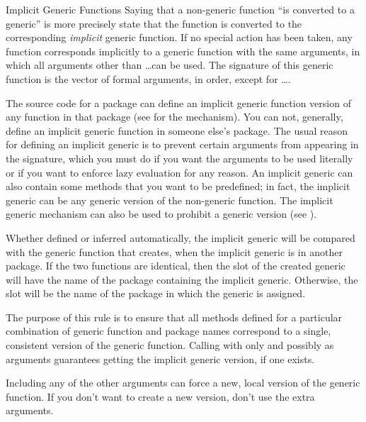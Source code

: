 %
\begin{Section}{Implicit Generic Functions}
Saying that a non-generic function ``is converted to a generic''
is more precisely state that the function is converted to the
corresponding \emph{implicit} generic function.  If no special action
has been taken, any function corresponds implicitly to a generic
function with the same arguments, in which all arguments other than
\dots can be used.  The signature of this generic function is the
vector of formal arguments, in order, except for \dots.

The source code for a package can define an implicit generic function
version of any function in that package (see 
for the mechanism).  You can not, generally, define an implicit
generic function in someone else's package. The usual reason for
defining an implicit generic is to prevent certain arguments from
appearing in the signature, which you must do if you want the
arguments to be used literally or if you want to enforce lazy
evaluation for any reason.  An implicit generic can also contain some
methods that you want to be predefined; in fact, the implicit generic
can be any generic version of the non-generic function.  The implicit
generic mechanism can also be used to prohibit a generic version (see
).

Whether defined or inferred automatically, the implicit generic will
be compared with the generic function that  creates,
when the implicit generic is in another package.  If the two functions
are identical, then the  slot of the created generic
will have the name of the package containing the implicit generic.
Otherwise, the slot will be the name of the package in which the
generic is assigned.

The purpose of this rule is to ensure that all methods defined for a
particular combination of generic function and package names
correspond to a single, consistent version of the generic function.
Calling  with only  and possibly
 as arguments guarantees getting the implicit generic
version, if one exists.

Including any of the other arguments can force a new, local version of
the generic function.  If you don't want to create a new version,
don't use the extra arguments.
\end{Section}
%
